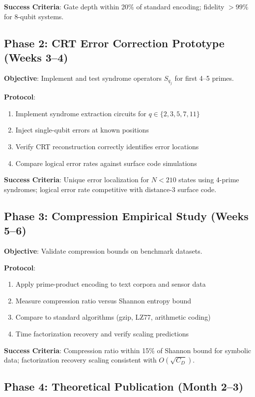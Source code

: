 \documentclass[12pt,a4paper]{article}
\begin{document}
\textbf{Success Criteria}: Gate depth within 20\% of standard encoding; fidelity $> 99\%$ for 8-qubit systems.

\subsection{Phase 2: CRT Error Correction Prototype (Weeks 3--4)}

\textbf{Objective}: Implement and test syndrome operators $S_{q_j}$ for first 4--5 primes.

\textbf{Protocol}:
\begin{enumerate}
    \item Implement syndrome extraction circuits for $q \in \{2, 3, 5, 7, 11\}$
    \item Inject single-qubit errors at known positions
    \item Verify CRT reconstruction correctly identifies error locations
    \item Compare logical error rates against surface code simulations
\end{enumerate}

\textbf{Success Criteria}: Unique error localization for $N < 210$ states using 4-prime syndromes; logical error rate competitive with distance-3 surface code.

\subsection{Phase 3: Compression Empirical Study (Weeks 5--6)}

\textbf{Objective}: Validate compression bounds on benchmark datasets.

\textbf{Protocol}:
\begin{enumerate}
    \item Apply prime-product encoding to text corpora and sensor data
    \item Measure compression ratio versus Shannon entropy bound
    \item Compare to standard algorithms (gzip, LZ77, arithmetic coding)
    \item Time factorization recovery and verify scaling predictions
\end{enumerate}

\textbf{Success Criteria}: Compression ratio within 15\% of Shannon bound for symbolic data; factorization recovery scaling consistent with $O(\sqrt{C_D})$.

\subsection{Phase 4: Theoretical Publication (Month 2--3)}
\end{document}
